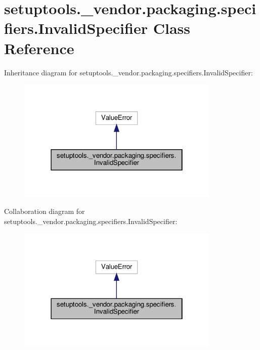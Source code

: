 \hypertarget{classsetuptools_1_1__vendor_1_1packaging_1_1specifiers_1_1InvalidSpecifier}{}\section{setuptools.\+\_\+vendor.\+packaging.\+specifiers.\+Invalid\+Specifier Class Reference}
\label{classsetuptools_1_1__vendor_1_1packaging_1_1specifiers_1_1InvalidSpecifier}


Inheritance diagram for setuptools.\+\_\+vendor.\+packaging.\+specifiers.\+Invalid\+Specifier\+:
\nopagebreak
\begin{figure}[H]
\begin{center}
\leavevmode
\includegraphics[width=274pt]{classsetuptools_1_1__vendor_1_1packaging_1_1specifiers_1_1InvalidSpecifier__inherit__graph}
\end{center}
\end{figure}


Collaboration diagram for setuptools.\+\_\+vendor.\+packaging.\+specifiers.\+Invalid\+Specifier\+:
\nopagebreak
\begin{figure}[H]
\begin{center}
\leavevmode
\includegraphics[width=274pt]{classsetuptools_1_1__vendor_1_1packaging_1_1specifiers_1_1InvalidSpecifier__coll__graph}
\end{center}
\end{figure}


